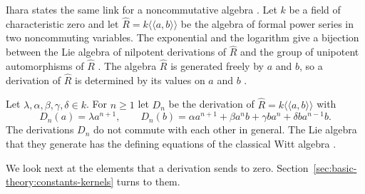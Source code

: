 Ihara states the same link for a noncommutative algebra
\cite[p.~192]{Ihara2012}. Let $k$ be a field of characteristic zero and let
$\hat R=k\langle\langle a,b\rangle\rangle$ be the algebra of formal power
series in two noncommuting variables. The exponential and the logarithm give a
bijection between the Lie algebra of nilpotent derivations of $\hat R$ and the
group of unipotent automorphisms of $\hat R$ \cite[p.~192]{Ihara2012}. The
algebra $\hat R$ is generated freely by $a$ and $b$, so a derivation of $\hat
R$ is determined by its values on $a$ and $b$ \cite[p.~192]{Ihara2012}.

\begin{example}\label{ex:basic:ihara}
Let $\lambda,\alpha,\beta,\gamma,\delta\in k$. For $n\ge 1$ let $D_n$ be the
derivation of $\hat R=k\langle\langle a,b\rangle\rangle$ with
\[
D_n(a)=\lambda a^{n+1},\qquad
D_n(b)=\alpha a^{n+1}+\beta a^{n}b+\gamma ba^{n}+\delta ba^{n-1}b .
\]
The derivations $D_n$ do not commute with each other in general. The Lie algebra
that they generate has the defining equations of the classical Witt algebra
\cite[p.~192]{Ihara2012}.
\end{example}

We look next at the elements that a derivation sends to zero.
Section~\ref{sec:basic-theory:constants-kernels} turns to them.
